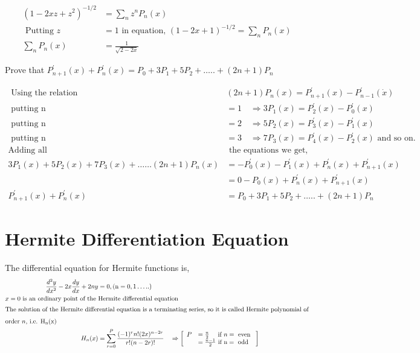 \begin{answer}
	\begin{align*}
	\left(1-2 x z+z^{2}\right)^{-1 / 2}&=\sum_{n} z^{n} P_{n}(x)\\
	\text { Putting } z&=1 \text { in equation, }(1-2 x+1)^{-1 / 2}=\sum_{n} P_{n}(x) \\ \sum_{n} P_{n}(x)&=\frac{1}{\sqrt{2-2 x}}
	\end{align*}
\end{answer}
\begin{exercise}
	Prove that $P_{n+1}^{\prime}(x)+P_{n}^{\prime}(x)=P_{0}+3 P_{1}+5 P_{2}+\ldots . .+(2 n+1) P_{n}$
\end{exercise}
\begin{answer}
	\begin{align*}
	\text { Using the relation }&(2 n+1) P_{n}(x)=P_{n+1}^{\prime}(x)-P_{n-1}^{\prime}(\dot{x})\\
	\text { putting } \mathrm{n}&=1 \quad \Rightarrow 3 P_{1}(x)=P_{2}^{\prime}(x)-P_{0}^{\prime}(x)\\
	\text { putting } \mathrm{n}&=2 \quad \Rightarrow 5 P_{2}(x)=P_{3}^{\prime}(x)-P_{1}^{\prime}(x)\\
	\text { putting } \mathrm{n}&=3 \quad \Rightarrow 7 P_{3}(x)=P_{4}^{\prime}(x)-P_{2}^{\prime}(x) \text { and so on. }\\
	\text{Adding all}&\text{ the equations we get,}\\
	3 P_{1}(x)+5 P_{2}(x)+7 P_{3}(x)+\ldots \ldots(2 n+1) P_{n}(x)
	&=-P_{0}^{\prime}(x)-P_{1}^{\prime}(x)+P_{n}^{\prime}(x)+P_{n+1}^{\prime}(x)\\&=0-P_{0}(x)+P_{n}^{\prime}(x)+P_{n+1}^{\prime}(x)\\
	 P_{n+1}^{\prime}(x)+P_{n}^{\prime}(x)&=P_{0}+3 P_{1}+5 P_{2}+\ldots . .+(2 n+1) P_{n}
	\end{align*}
\end{answer}

\section{Hermite Differentiation Equation}
The diﬀerential equation for Hermite functions is,
\begin{align*}
\frac{d^{2} y}{d x^{2}}-2 x \frac{d y}{d x}+2 n y&=0,(\mathrm{n}=0,1 \ldots . .)\\
\text{$x=0$ is an ordinary point of the }&\text{Hermite differential equation}\\
\intertext{The solution of the Hermite differential equation is a terminating series, so it is called Hermite polynomial of}
\intertext{order $n$, i.e. $\mathrm{H}_{\mathrm{n}}(\mathrm{x})$}
H_{n}(x)&=\sum_{r=0}^{P} \frac{(-1)^{r} n !(2 x)^{n-2 r}}{r !(n-2 r) !} \quad \Rightarrow\left[\begin{array}{ll}
P&=\frac{n}{2}\quad \text { if } n=\text { even } \\
&=\frac{n-1}{2}  \text { if } \mathrm{n}= \text {  odd }
\end{array}\right]
\end{align*}
